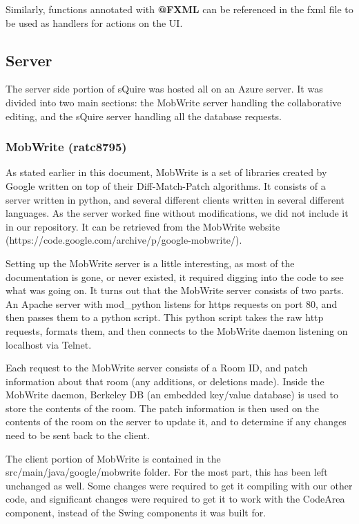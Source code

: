 \documentclass[twoside,letterpaper]{article}
\begin{document}
Similarly, functions annotated with \textbf{@FXML} can be referenced in the fxml file to be used as handlers for actions on the UI.


\newpage
\subsection{Server}
The server side portion of sQuire was hosted all on an Azure server. It was divided into two main sections: the MobWrite server handling the collaborative editing, and the sQuire server handling all the database requests.

\subsubsection{MobWrite (ratc8795)}
As stated earlier in this document, MobWrite is a set of libraries created by Google written on top of their Diff-Match-Patch algorithms. It consists of a server written in python, and several different clients written in several different languages. As the server worked fine without modifications, we did not include it in our repository. It can be retrieved from the MobWrite website (https://code.google.com/archive/p/google-mobwrite/).

Setting up the MobWrite server is a little interesting, as most of the documentation is gone, or never existed, it required digging into the code to see what was going on. It turns out that the MobWrite server consists of two parts. An Apache server with mod\_python listens for https requests on port 80, and then passes them to a python script. This python script takes the raw http requests, formats them, and then connects to the MobWrite daemon listening on localhost via Telnet.

Each request to the MobWrite server consists of a Room ID, and patch information about that room (any additions, or deletions made). Inside the MobWrite daemon, Berkeley DB (an embedded key/value database) is used to store the contents of the room. The patch information is then used on the contents of the room on the server to update it, and to determine if any changes need to be sent back to the client.

\bigskip
The client portion of MobWrite is contained in the src/main/java/google/mobwrite folder. For the most part, this has been left unchanged as well. Some changes were required to get it compiling with our other code, and significant changes were required to get it to work with the CodeArea component, instead of the Swing components it was built for.
\end{document}
